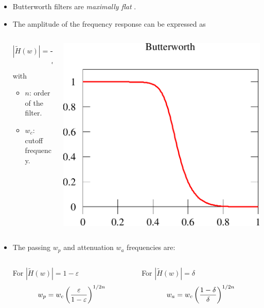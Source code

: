 \begin{itemize}
  \item  Butterworth filters are  \emph{maximally
    flat} \cite{butterworth1930theory}.
\item The amplitude of the frequency response can be expressed as
  \begin{columns}
        \begin{column}{6cm}
    \begin{equation}
      \label{eq:a_butter}
      |\tilde H(w)|=\frac{1}{\sqrt{1+\left(\frac{w}{w_c}\right)^{2n}}}
    \end{equation}
    with
    \begin{itemize}
    \item $n$: order of the filter.
    \item $w_c$: cutoff frequency.
    \end{itemize}
  \end{column}
  \begin{column}{4cm}
    \includegraphics[width=.5\columnwidth]{imgs/fourier/butterworth}
  \end{column}
  \end{columns}
\item The passing $w_p$ and
  attenuation $w_a$ frequencies  are:
\vspace{.5cm}
\begin{columns}
     \begin{column}{5.5cm}
For $|\tilde H(w)|=1-\varepsilon$
   $$w_p={ w_c\left(\frac{\varepsilon}{1-\varepsilon}\right)^{1/2n}}$$
  \end{column}
  \begin{column}{5.5cm}
For $|\tilde H(w)|=\delta$
$$w_a= {w_c\left(\frac{1-\delta}{\delta}\right)^{1/2n}}$$
  \end{column}
  \end{columns}

  \end{itemize}

